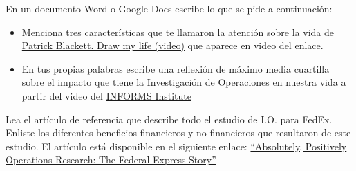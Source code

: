 \begin{frameact}{1.1}
  En un documento Word o Google Docs escribe lo que se pide a continuación:

  \begin{itemize} \justifying
  \item Menciona tres características que te llamaron la atención sobre la vida de \href{https://www.youtube.com/watch?v=jg5IQ5Hf2G0}{Patrick Blackett. Draw my life (video)} que aparece en video del enlace.

  \item En tus propias palabras escribe una reflexión de máximo media cuartilla sobre el impacto que tiene la Investigación de Operaciones en nuestra vida a partir del video del \href{https://www.youtube.com/watch?v=sFWrmpXPVJw}{INFORMS Institute}
  \end{itemize}
\end{frameact}

\begin{frameact}{1.2}
  Lea el artículo de referencia que describe todo el estudio de I.O. para FedEx. Enliste los diferentes beneficios financieros y no financieros que resultaron de este estudio. El artículo está disponible en el siguiente enlace: \href{https://drive.google.com/file/d/1b8VCLpjFeBWOssiuRRNjnjSkSGwoGaA9/view?usp=sharing}{“Absolutely, Positively Operations Research: The Federal Express Story”}
\end{frameact}

